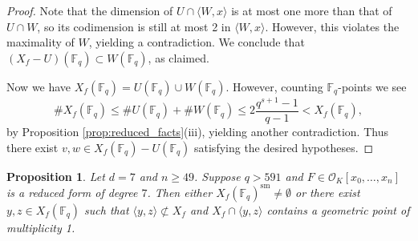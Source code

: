 \documentclass{amsart}
\newcommand{\F}{\mathbb{F}}
\renewcommand{\O}{\mathcal{O}}
\newcommand{\Span}[1]{\langle #1 \rangle}
\newcommand{\sm}{\mathrm{sm}}
\newtheorem{proposition}[theorem]{Proposition}
\theoremstyle{definition}
\numberwithin{equation}{section}
\numberwithin{table}{section}
\newcommand{\qbound}[1]{{\color{cyan}$q > {#1}$}}
\renewcommand{\qbound}[1]{{$q > {#1}$}}
\begin{document}
\begin{proof}
    Note that the dimension of $U \cap \Span{W,x}$ is at most one more than that of $U \cap W$, so its codimension is still at most 2 in $\Span{W,x}$. However, this violates the maximality of $W$, yielding a contradiction. We conclude that $(X_f - U)(\F_q) \subset W(\F_q)$, as claimed.

    Now we have $X_f(\F_q) = U(\F_q) \cup W(\F_q)$. However, counting $\F_q$-points we see
    \[\#X_f(\F_q) \leq \#U(\F_q) + \#W(\F_q) \leq 2 \frac{q^{s+1}-1}{q-1} < X_f(\F_q),\]
    by Proposition \ref{prop:reduced_facts}(iii), yielding another contradiction. Thus there exist $v,w \in X_f(\F_q) - U(\F_q)$ satisfying the desired hypotheses.
\end{proof}

\begin{proposition}
\label{prop:leep_and_yeomanry}
	Let $d = 7$ and $n \geq 49$. Suppose \qbound{591} and $F \in \O_K[x_0, \ldots, x_n]$ is a reduced form of degree $7$. Then either $X_f(\F_q)^{\sm} \neq \emptyset$ or there exist $y,z \in X_f(\F_q)$ such that $\Span{y,z} \not\subset X_f$ and $X_f \cap \Span{y,z}$ contains a geometric point of multiplicity 1.
\end{proposition}
\end{document}

